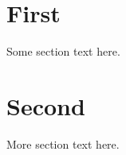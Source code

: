 \documentclass{article}
\begin{document}
\section{First}
Some section text here.
\section{Second}
More section text here.
\end{document}
